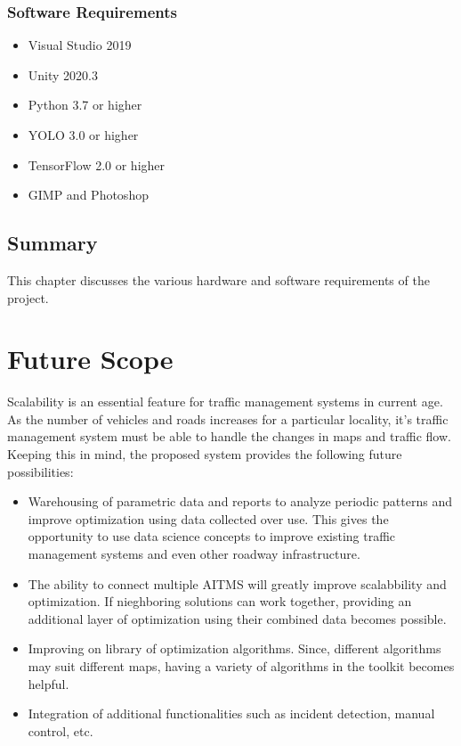 \documentclass[openany,12pt]{report}
\begin{document}
	\subsection{Software Requirements}
	\begin{itemize}
		\item{Visual Studio 2019}
		\item{Unity 2020.3}
		\item{Python 3.7 or higher}
		\item{YOLO 3.0 or higher}
		\item{TensorFlow 2.0 or higher}
		\item{GIMP and Photoshop}
	\end{itemize}
	
	\section{Summary}
	\hspace*{0.5in}This chapter discusses the various hardware and software requirements of the project.
	\chapter {Future Scope}
	
	\hspace{0.5in}Scalability is an essential feature for traffic management systems in current age. As the number of vehicles and roads increases for a particular locality, it's traffic management system must be able to handle the changes in maps and traffic flow. Keeping this in mind, the proposed system provides the following future possibilities:\\
	
	\begin{itemize}
		\item{Warehousing of parametric data and reports to analyze periodic patterns and improve optimization using data collected over use. This gives the opportunity to use data science concepts to improve existing traffic management systems and even other roadway infrastructure.}
		\item{The ability to connect multiple AITMS will greatly improve scalabbility and optimization. If nieghboring solutions can work together, providing an additional layer of optimization using their combined data becomes possible.}
		\item{Improving on library of optimization algorithms. Since, different algorithms may suit different maps, having a variety of algorithms in the toolkit becomes helpful.}
		\item{Integration of additional functionalities such as incident detection, manual control, etc.}
	\end{itemize}
	
\end{document}
